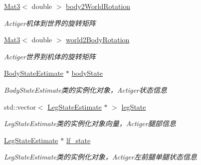 \begin{DoxyCompactItemize}
\hyperlink{cppTypes_8h_adb7d462b35d31f0b2583b3e230a2a2c3}{Mat3}$<$ double $>$ \hyperlink{classquadruped_1_1RobotModel_ad87774c5afff28e4717a41b64f9687ac}{body2\+World\+Rotation}
\begin{DoxyCompactList}\small\item\em Actiger机体到世界的旋转矩阵 \end{DoxyCompactList}\item 
\mbox{\label{classquadruped_1_1RobotModel_a540ae66ffb3b7e030579a1fd89822cce}} 
\hyperlink{cppTypes_8h_adb7d462b35d31f0b2583b3e230a2a2c3}{Mat3}$<$ double $>$ \hyperlink{classquadruped_1_1RobotModel_a540ae66ffb3b7e030579a1fd89822cce}{world2\+Body\+Rotation}
\begin{DoxyCompactList}\small\item\em Actiger世界到机体的旋转矩阵 \end{DoxyCompactList}\item 
\mbox{\label{classquadruped_1_1RobotModel_ad02341a0f4d5fe89ce3a113c81500ed0}} 
\hyperlink{classquadruped_1_1BodyStateEstimate}{Body\+State\+Estimate} $\ast$ \hyperlink{classquadruped_1_1RobotModel_ad02341a0f4d5fe89ce3a113c81500ed0}{body\+State}
\begin{DoxyCompactList}\small\item\em Body\+State\+Estimate类的实例化对象，\+Actiger状态信息 \end{DoxyCompactList}\item 
\mbox{\label{classquadruped_1_1RobotModel_a6044bbc57eca179b4c040c4d7eac52a6}} 
std\+::vector$<$ \hyperlink{classquadruped_1_1LegStateEstimate}{Leg\+State\+Estimate} $\ast$ $>$ \hyperlink{classquadruped_1_1RobotModel_a6044bbc57eca179b4c040c4d7eac52a6}{leg\+State}
\begin{DoxyCompactList}\small\item\em Leg\+State\+Estimate类的实例化对象向量，\+Actiger腿部信息 \end{DoxyCompactList}\item 
\mbox{\label{classquadruped_1_1RobotModel_a7a220b895639bb7357ac98323943030f}} 
\hyperlink{classquadruped_1_1LegStateEstimate}{Leg\+State\+Estimate} $\ast$ \hyperlink{classquadruped_1_1RobotModel_a7a220b895639bb7357ac98323943030f}{lf\+\_\+state}
\begin{DoxyCompactList}\small\item\em Leg\+State\+Estimate类的实例化对象，\+Actiger左前腿单腿状态信息 \end{DoxyCompactList}\item 

\end{DoxyCompactItemize}
